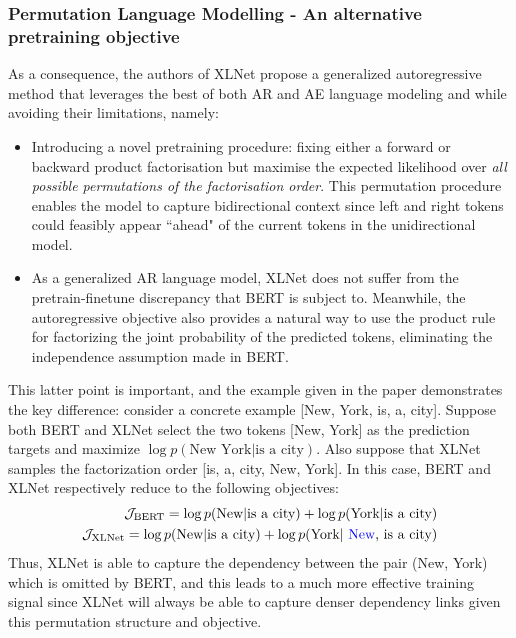 {{\subsubsection{Permutation Language Modelling - An alternative pretraining objective}
As a consequence, the authors of XLNet propose a generalized autoregressive method that leverages the best of both AR and AE language modeling and while avoiding their limitations, namely:
\begin{itemize}
	\item Introducing a novel pretraining procedure: fixing either a forward or backward product factorisation but maximise the expected likelihood over \textit{all possible permutations of the factorisation order}. This permutation procedure enables the model to capture bidirectional context since left and right tokens could feasibly appear ``ahead" of the current tokens in the unidirectional model.
	\item As a generalized AR language model, XLNet does not suffer from the pretrain-finetune discrepancy that BERT is subject to. Meanwhile, the autoregressive objective also provides a natural way to use the product rule for factorizing the joint probability of the predicted tokens, eliminating the independence assumption made in BERT.
\end{itemize}
This latter point is important, and the example given in the paper demonstrates the key difference: consider a concrete example [New, York, is, a, city]. Suppose both BERT and XLNet select the two tokens [New, York] as the prediction targets and maximize $\log p(\text{New York} | \text{is a city})$. Also suppose that XLNet samples the factorization order [is, a, city, New, York]. In this case, BERT and XLNet respectively reduce to the following objectives:
\begin{align*}
\mathcal{J}_{\text{BERT}} = \log p(\text{New} | \text{is a city}) + \log p(\text{York} | \text{is a city}) \\
\mathcal{J}_{\text{XLNet}} = \log p(\text{New} | \text{is a city}) + \log p(\text{York} | \text{ {\color{blue} New}, is a city})
\end{align*}
Thus, XLNet is able to capture the dependency between the pair (New, York) which is omitted by BERT, and this leads to a much more effective training signal since XLNet will always be able to capture denser dependency links given this permutation structure and objective.

}}
